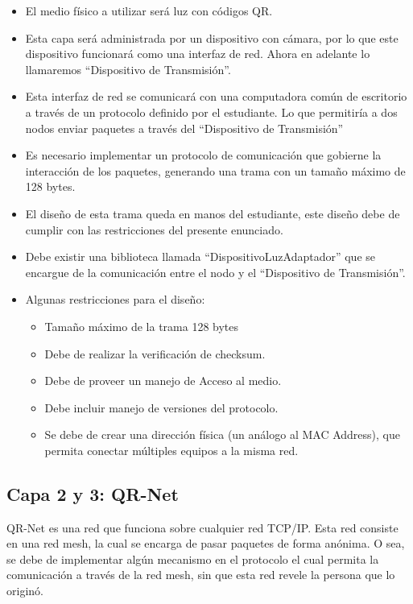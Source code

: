 \documentclass{article}
\providecommand{\tightlist}{%
          \setlength{\itemsep}{0pt}\setlength{\parskip}{0pt}}
\begin{document}
\begin{itemize}
\tightlist
\item
  El medio físico a utilizar será luz con códigos QR.
\item
  Esta capa será administrada por un dispositivo con cámara, por lo que
  este dispositivo funcionará como una interfaz de red. Ahora en
  adelante lo llamaremos ``Dispositivo de Transmisión''.
\item
  Esta interfaz de red se comunicará con una computadora común de
  escritorio a través de un protocolo definido por el estudiante. Lo que
  permitiría a dos nodos enviar paquetes a través del ``Dispositivo de
  Transmisión''
\item
  Es necesario implementar un protocolo de comunicación que gobierne la
  interacción de los paquetes, generando una trama con un tamaño máximo
  de 128 bytes.
\item
  El diseño de esta trama queda en manos del estudiante, este diseño
  debe de cumplir con las restricciones del presente enunciado.
\item
  Debe existir una biblioteca llamada ``DispositivoLuzAdaptador'' que se
  encargue de la comunicación entre el nodo y el ``Dispositivo de
  Transmisión''.
\item
  Algunas restricciones para el diseño:

  \begin{itemize}
  \tightlist
  \item
    Tamaño máximo de la trama 128 bytes
  \item
    Debe de realizar la verificación de checksum.
  \item
    Debe de proveer un manejo de Acceso al medio.
  \item
    Debe incluir manejo de versiones del protocolo.
  \item
    Se debe de crear una dirección física (un análogo al MAC Address),
    que permita conectar múltiples equipos a la misma red.
  \end{itemize}
\end{itemize}

\subsection{Capa 2 y 3: QR-Net}\label{capa-2-y-3-qr-net}

QR-Net es una red que funciona sobre cualquier red TCP/IP. Esta red
consiste en una red mesh, la cual se encarga de pasar paquetes de forma
anónima. O sea, se debe de implementar algún mecanismo en el protocolo
el cual permita la comunicación a través de la red mesh, sin que esta
red revele la persona que lo originó.
\end{document}
